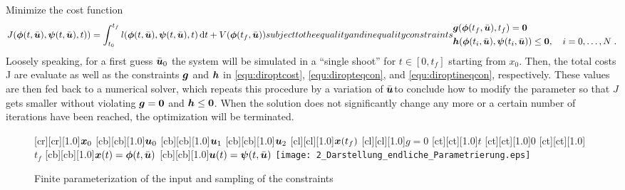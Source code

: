 Minimize the cost function
\begin{subequations}
\begin{align}
J(\bs{\phi}(t,\bar{\bs{u}}),\bs{\psi}(t,\bar{\bs{u}}),t)) = 
	\int_{t_0}^{t_f} l(\bs{\phi}(t,\bar{\bs{u}}),\bs{\psi}(t,\bar{\bs{u}}),t)\,{\rm d} t + V(\bs{\phi}(t_f,\bar{\bs{u}}))
\label{equ:diroptcost}
\end{align}
subject to the equality and inequality constraints
\begin{align}
	 &\bs{g}(\bs{\phi}(t_f,\bar{\bs{u}}),t_f) = \bs{0} \label{equ:diropteqcon}\\ 	
	&\bs{h}(\bs{\phi}(t_i,\bar{\bs{u}}),\bs{\psi}(t_i,\bar{\bs{u}}))  \leq \bs{0},  \quad  i=0,\ldots,N \label{equ:diroptineqcon}\;. 
\end{align} 
\end{subequations}
Loosely speaking, for a first guess $\bar{\boldsymbol{u}}_0$ the system will be simulated in a “single shoot” for $t \in [0,t_f]$  starting from $x_0$. Then, the total costs J are evaluate as well as the constraints $\boldsymbol{g}$ and $\boldsymbol{h}$ in \eqref{equ:diroptcost}, \eqref{equ:diropteqcon}, and \eqref{equ:diroptineqcon}, respectively. These values are then fed back to a numerical solver, which repeats this procedure by a variation of $\bar{\boldsymbol{u}}$to conclude how to modify the parameter so that $J$ gets smaller without violating $\boldsymbol{g}=\boldsymbol{0}$ and $\boldsymbol{h}\leq\boldsymbol{0}$. When the solution does not significantly change any more or a certain number of iterations have been reached, the optimization will be terminated.



\begin{figure}[h]
\centering
	[cr][cr][1.0]{$\boldsymbol{x}_0$}
	[cb][cb][1.0]{$\boldsymbol{u}_0$}
	[cb][cb][1.0]{$\boldsymbol{u}_1$}
	[cb][cb][1.0]{$\boldsymbol{u}_2$}
	[cl][cl][1.0]{$\boldsymbol{x}(t_f)$}
	[cl][cl][1.0]{$g=0$}
	[ct][ct][1.0]{$t$}
	[ct][ct][1.0]{$0$}
	[ct][ct][1.0]{$t_f$}
	[cb][cb][1.0]{$\boldsymbol{x}(t) = \boldsymbol{\phi}(t,\bar{\boldsymbol{u}})$}
	[cb][cb][1.0]{$\boldsymbol{u}(t) = \boldsymbol{\psi}(t,\bar{\boldsymbol{u}})$}
 \texttt{[image: 2\_Darstellung\_endliche\_Parametrierung.eps]}
	\caption[Finite parameterization of the input]{Finite parameterization of the input and sampling of the constraints \cite{papageorgiou2012optimierung}} 
	\label{fig:parametrisierte_nmpc}
\end{figure}


